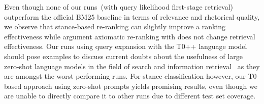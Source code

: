 Even though none of our runs~(with query likelihood first-stage retrieval) outperform the official BM25 baseline in terms of relevance and rhetorical quality, we observe that stance-based re-ranking can slightly improve a ranking effectiveness while argument axiomatic re-ranking with \KwikSort does not change retrieval effectiveness. Our runs using query expansion with the T0++ language model~\cite{SanhWRBSACSLRDBXTSSKCNDCJWMSYPBWNRSSFFTBGBWR2021} should pose examples to discuss current doubts about the usefulness of large zero-shot language models in the field of search and information retrieval~\cite{ShahB2022} as they are amongst the worst performing runs. For stance classification however, our T0-based approach using zero-shot prompts yields promising results, even though we are unable to directly compare it to other runs due to different test set coverage.


